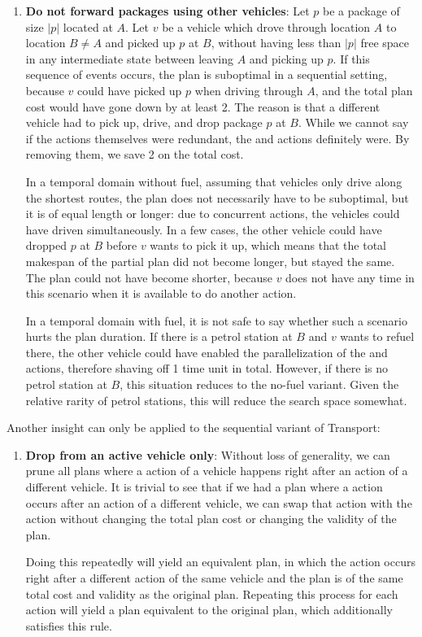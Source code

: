 \begin{enumerate}
\item \textbf{Do not forward packages using other vehicles}:
Let $p$ be a package of size $|p|$ located at $A$.
Let $v$ be a vehicle which drove through location $A$ to location $B \neq A$
and picked up $p$ at $B$,
without having less than $|p|$ free space in any intermediate state between leaving $A$ and picking up $p$.
If this sequence of events occurs, the plan is suboptimal in a sequential setting, because
$v$ could have picked up $p$ when driving through $A$, and the total plan cost
would have gone down by at least 2. The reason is that a different vehicle had to pick up, drive, and drop package $p$ at $B$.
While we cannot say if the \drive{} actions themselves
were redundant, the \pickup{} and \drop{} actions definitely were.
By removing them, we save 
2 on the total cost. 

In a temporal domain without fuel, assuming that vehicles only drive along the shortest routes,
the plan does not necessarily have to be suboptimal, but it
is of equal length or longer: due to concurrent actions, the vehicles could have driven simultaneously.
In a few cases, the other vehicle could have dropped $p$ at $B$ before $v$ wants to pick it up,
which means that the total makespan of the partial plan did not become longer, but stayed the same.
The plan could not have become shorter, because $v$ does not have any time in this scenario when it is available to do another action.

In a temporal domain with fuel, it is not safe to say whether
such a scenario hurts the plan duration. If there is a petrol station at $B$
and $v$ wants to refuel there, the other vehicle could have enabled the parallelization 
of the  and \pickup{} actions, therefore shaving off 1 time unit in total.
However, if there is no petrol
station at $B$, this situation reduces to the no-fuel variant. Given the relative rarity of petrol stations, this will reduce the search space somewhat.
\end{enumerate}
Another insight can only be applied to the sequential variant of Transport:
\begin{enumerate}
\item \textbf{Drop from an active vehicle only}: Without loss of generality,
we can prune all plans where a \drop{} action of a vehicle happens
right after an action of a different vehicle. It is trivial to see that if we had a plan where
a \drop{} action
occurs after an action of a different vehicle, we can swap that action with the \drop{} action without changing the total plan cost or changing the validity of the plan.

Doing this repeatedly will yield an equivalent plan, in which the \drop{} action
occurs right after a different action of the same vehicle and the plan is of the same total cost and validity as the original plan. Repeating this process for each \drop{} action will yield a plan equivalent to the original plan, which additionally satisfies this rule.
\end{enumerate}
